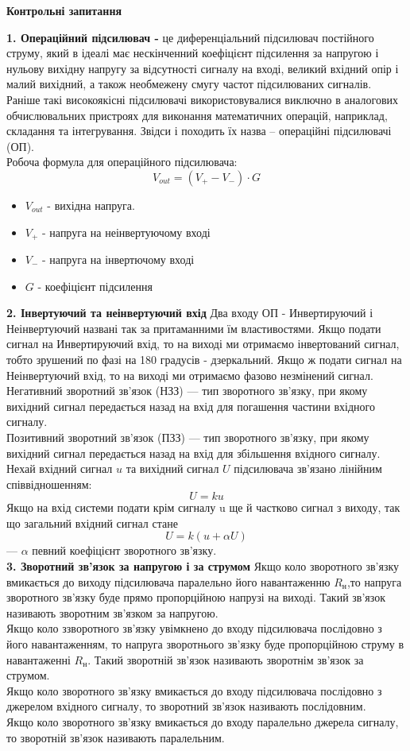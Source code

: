 
\begin{center}
  \textbf{Контрольні запитання}
\end{center}
\qquad \textbf{1. Операційний підсилювач - } це
диференціальний підсилювач постійного струму, який в ідеалі має
нескінченний коефіцієнт підсилення за напругою і нульову вихідну напругу за
відсутності сигналу на вході, великий вхідний опір і малий вихідний, а також
необмежену смугу частот підсилюваних сигналів. Раніше такі високоякісні
підсилювачі використовувалися виключно в аналогових обчислювальних
пристроях для виконання математичних операцій, наприклад, складання та
інтегрування. Звідси і походить їх назва – операційні підсилювачі (ОП). \\
Робоча формула для операційного підсилювача:
$$V_{out} = (V_{+} - V_{-})\cdot G$$
\begin{itemize}
  \item $V_{out}$ - вихідна напруга.
  \item $V_{+}$ - напруга на неінвертуючому вході
  \item $V_{-}$ -  напруга на інвертючому вході
  \item $G$ - коефіцієнт підсилення
\end{itemize}
\par
\textbf{2. Інвертуючий та неінвертуючий вхід} Два входу ОП - Инвертируючий і Неінвертуючий названі так за притаманними їм властивостями. Якщо подати сигнал на Инвертируючий вхід, то на виході ми отримаємо інвертований сигнал, тобто зрушений по фазі на 180 градусів - дзеркальний. Якщо ж подати сигнал на Неінвертуючий вхід, то на виході ми отримаємо фазово незмінений сигнал.\\
Негативний зворотний зв'язок (НЗЗ) — тип зворотного зв'язку, при якому вихідний сигнал передається назад на вхід для погашення частини вхідного сигналу.\\
Позитивний зворотний зв'язок (ПЗЗ) — тип зворотного зв'язку, при якому вихідний сигнал передається назад на вхід для збільшення вхідного сигналу.\\
Нехай вхідний сигнал $u$ та вихідний сигнал $U$ підсилювача зв'язано лінійним співвідношенням:
$$U = ku$$
Якщо на вхід системи подати крім сигналу u ще й частково сигнал з виходу, так що загальний вхідний сигнал стане $$U = k(u + \alpha U)$$  — $\alpha$ певний коефіцієнт зворотного зв'язку. \\
\textbf{3. Зворотний зв’язок за напругою і за струмом}
Якщо коло зворотного зв'язку вмикається до виходу підсилювача паралельно його навантаженню $R_{н}$,то напруга зворотного зв'язку буде прямо пропорційною напрузі на виході. Такий зв'язок називають зворотним зв'язком за напругою.\\
Якщо коло ззворотного зв'язку увімкнено до входу підсилювача послідовно з його навантаженням, то напруга зворотнього зв'язку буде пропорційною струму в навантаженні $R_{н}$. Такий зворотній зв'язок називають зворотнім зв'язок за струмом.\\
Якщо коло зворотного зв'язку вмикається до входу підсилювача послідовно з джерелом вхідного сигналу, то зворотний зв'язок називають послідовним.\\
Якщо коло зворотного зв'язку вмикається до входу паралельно джерела сигналу, то зворотній зв'язок називають паралельним.

